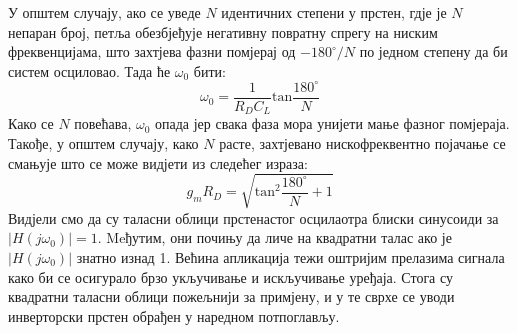 \documentclass[master]{finthesis}
\begin{document}
У општем случају, ако се уведе $N$ идентичних степени у прстен, гдје је $N$ непаран број, петља обезбјеђује негативну повратну спрегу на ниским фреквенцијама, што захтјева фазни помјерај од $-180^{\circ}/N$ по једном степену да би систем осциловао. Тада ће $\omega_{0}$ бити:
\begin{equation}
	\label{osc_feedback_eq_20}
	\displaystyle
	\omega_{0} = \frac{1}{R_{D}C_{L}}\text{tan}\frac{180^{\circ}}{N}
\end{equation}
Како се $N$ повећава, $\omega_{0}$ опада јер свака фаза мора унијети мање фазног помјераја. Такође, у општем случају, како $N$ расте, захтјевано нискофреквентно појачање се смањује што се може видјети из следећег израза:
\begin{equation}
	\label{osc_feedback_eq_21}
	\displaystyle
	g_{m}R_{D} = \sqrt{\text{tan}^{2}\frac{180^{\circ}}{N}+1}
\end{equation}
Видјели смо да су таласни облици прстенастог осцилаотра блиски синусоиди за $|H(j\omega_{0})|=1$. Meђутим, они почињу да личе на квадратни талас ако је $|H(j\omega_{0})|$ знатно изнад 1. Већина апликација тежи оштријим прелазима сигнала како би се осигурало брзо укључивање и искључивање уређаја. Стога су квадратни таласни облици пожељнији за примјену, и у те сврхе се уводи инверторски прстен обрађен у наредном потпоглављу.
\end{document}
